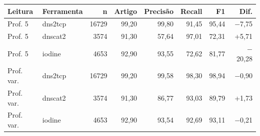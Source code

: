 \begin{tabular}{llrrrrrr}
\hline
\textbf{Leitura} & \textbf{Ferramenta} & \textbf{n} & \textbf{Artigo} & \textbf{Precisão} & \textbf{Recall} & \textbf{F1} & \textbf{Dif.} \\ \hline
Prof. 5 & dns2tcp & 16729 & 99,20 & 99,80 & 91,45 & 95,44 & $-$7,75 \\
Prof. 5 & dnscat2 & 3574 & 91,30 & 57,64 & 97,01 & 72,31 & +5,71 \\
Prof. 5 & iodine & 4653 & 92,90 & 93,55 & 72,62 & 81,77 & $-$20,28 \\
\hline
Prof. var. & dns2tcp & 16729 & 99,20 & 99,58 & 98,30 & 98,94 & $-$0,90 \\
Prof. var. & dnscat2 & 3574 & 91,30 & 86,77 & 93,03 & 89,79 & +1,73 \\
Prof. var. & iodine & 4653 & 92,90 & 93,54 & 92,69 & 93,11 & $-$0,21 \\
\hline
\end{tabular}
